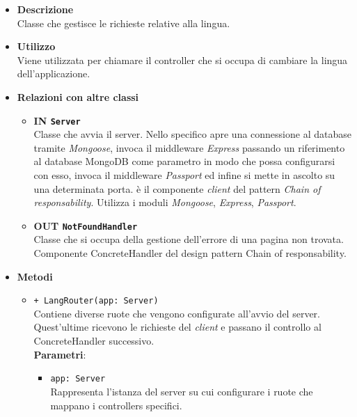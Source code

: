 	\begin{itemize}
		\item \textbf{Descrizione} \\
		Classe che gestisce le richieste relative alla lingua.
		\item \textbf{Utilizzo} \\
		Viene utilizzata per chiamare il controller che si occupa di cambiare la lingua dell'applicazione.
		\item \textbf{Relazioni con altre classi}
			\begin{itemize}
				\item \textbf{IN \texttt{Server}} \\
				Classe che avvia il server. Nello specifico apre una connessione al database tramite \textit{Mongoose}, invoca il middleware\ped{G} \textit{Express} passando un riferimento al database MongoDB come parametro in modo che possa configurarsi con esso, invoca il middleware \textit{Passport} ed infine si mette in ascolto su una determinata porta. è il componente \textit{client} del pattern \textit{Chain of responsability}. Utilizza i moduli \textit{Mongoose}, \textit{Express}, \textit{Passport}.
				\item \textbf{OUT \texttt{NotFoundHandler}} \\
				Classe che si occupa della gestione dell'errore di una pagina non trovata. Componente ConcreteHandler del design pattern Chain of responsability.
			\end{itemize}
		\item \textbf{Metodi}
			\begin{itemize}
				\item \texttt{+ LangRouter(app: Server)} \\
				Contiene diverse ruote che vengono configurate all'avvio del server. Quest'ultime ricevono le richieste del \textit{client} e passano il controllo al ConcreteHandler successivo. \\
				\textbf{Parametri}:
					\begin{itemize}
						\item \texttt{app: Server} \\
						Rappresenta l'istanza del server su cui configurare i ruote che mappano i controllers specifici.
					\end{itemize}
			\end{itemize}
	\end{itemize}